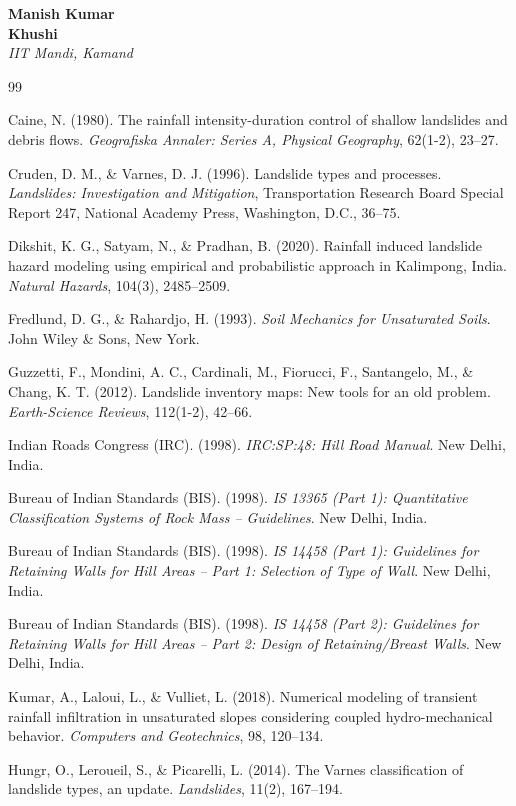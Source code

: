 \documentclass[12pt,a4paper]{report}
\begin{document}
\vspace{2cm}
\noindent \textbf{Manish Kumar}\\
\textbf{Khushi}\\
\textit{IIT Mandi, Kamand}

\newpage

\begin{thebibliography}{99}

Caine, N. (1980). The rainfall intensity-duration control of shallow landslides and debris flows. \textit{Geografiska Annaler: Series A, Physical Geography}, 62(1-2), 23--27.

Cruden, D. M., \& Varnes, D. J. (1996). Landslide types and processes. \textit{Landslides: Investigation and Mitigation}, Transportation Research Board Special Report 247, National Academy Press, Washington, D.C., 36--75.

Dikshit, K. G., Satyam, N., \& Pradhan, B. (2020). Rainfall induced landslide hazard modeling using empirical and probabilistic approach in Kalimpong, India. \textit{Natural Hazards}, 104(3), 2485--2509.

Fredlund, D. G., \& Rahardjo, H. (1993). \textit{Soil Mechanics for Unsaturated Soils}. John Wiley \& Sons, New York.

Guzzetti, F., Mondini, A. C., Cardinali, M., Fiorucci, F., Santangelo, M., \& Chang, K. T. (2012). Landslide inventory maps: New tools for an old problem. \textit{Earth-Science Reviews}, 112(1-2), 42--66.

Indian Roads Congress (IRC). (1998). \textit{IRC:SP:48: Hill Road Manual}. New Delhi, India.

Bureau of Indian Standards (BIS). (1998). \textit{IS 13365 (Part 1): Quantitative Classification Systems of Rock Mass -- Guidelines}. New Delhi, India.

Bureau of Indian Standards (BIS). (1998). \textit{IS 14458 (Part 1): Guidelines for Retaining Walls for Hill Areas -- Part 1: Selection of Type of Wall}. New Delhi, India.

Bureau of Indian Standards (BIS). (1998). \textit{IS 14458 (Part 2): Guidelines for Retaining Walls for Hill Areas -- Part 2: Design of Retaining/Breast Walls}. New Delhi, India.

Kumar, A., Laloui, L., \& Vulliet, L. (2018). Numerical modeling of transient rainfall infiltration in unsaturated slopes considering coupled hydro-mechanical behavior. \textit{Computers and Geotechnics}, 98, 120--134.

Hungr, O., Leroueil, S., \& Picarelli, L. (2014). The Varnes classification of landslide types, an update. \textit{Landslides}, 11(2), 167--194.

\end{thebibliography}
\end{document}
